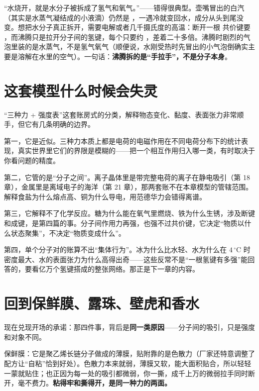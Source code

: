 \begin{wuqu}
“水烧开，就是水分子被拆成了氢气和氧气。”——错得很典型。壶嘴冒出的白汽（其实是水蒸气凝结成的小液滴）仍然是 ，一遇冷就变回水，成分从头到尾没变。想把水分子真正拆开，需要电解或者几千摄氏度的高温：断开一根  共价键要 ，而沸腾只是拉开分子间的氢键，每个只要约 ，差着二十多倍。沸腾时剧烈的气泡里装的是水蒸气，不是氢气氧气（顺便说，水刚受热时先冒出的小气泡倒确实主要是溶解在水里的空气）。一句话：\textbf{沸腾拆的是“手拉手”，不是分子本身}。
\end{wuqu}

\section{这套模型什么时候会失灵}

“三种力 + 强度表”这套账房式的分类，解释物态变化、黏度、表面张力非常顺手，但它有几条明确的边界。

第一，它是近似。三种力本质上都是电荷的电磁作用在不同电荷分布下的统计表现，真实世界里它们的界限是模糊的——把一个相互作用归入哪一类，有时取决于你看问题的精度。

第二，它管的是“分子之间”。离子晶体里是带完整电荷的离子在静电吸引（第 18 章），金属里是离域电子的海洋（第 21 章），那两套账不在本章模型的管辖范围。解释食盐为什么熔点高、铜为什么导电，用范德华力会错得离谱。

第三，它解释不了化学反应。糖为什么能在氧气里燃烧、铁为什么生锈，涉及断键和成键，是第四篇的事。分子间作用力再强，也强不过共价键，它决定“物质以什么状态聚集”，不决定“物质变成什么”。

第四，单个分子对的账算不出“集体行为”。冰为什么比水轻、水为什么在 $4\,^{\circ}\mathrm{C}$ 时密度最大、水的表面张力为什么高得出奇——这些反常不是“一根氢键有多强”能回答的，要看亿万个氢键搭成的整张网络。那正是下一章的内容。

\section{回到保鲜膜、露珠、壁虎和香水}

现在兑现开场的承诺：那四件事，背后是\textbf{同一类原因}——分子间的吸引，只是强度和对象不同。

保鲜膜：它是聚乙烯长链分子做成的薄膜，贴附靠的是色散力（厂家还特意调整了配方让“自粘”恰到好处）。色散力本来就弱，薄膜又软，能大面积贴合，所以轻轻一蒙就贴住；也正因为每一处的吸引都微弱，你一撕，成千上万的微弱拉手同时断开，毫不费力。\textbf{粘得牢和撕得开，是同一种力的两面。}

